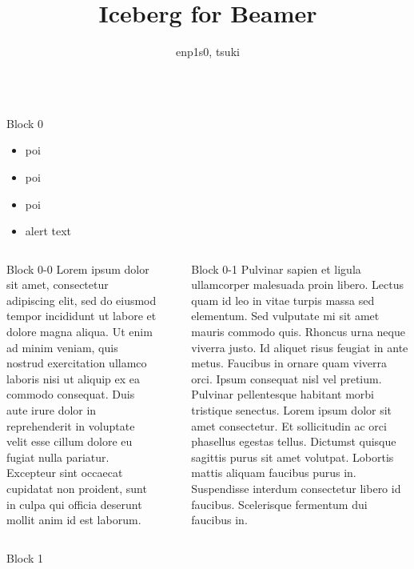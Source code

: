 \documentclass[final,dvipdfmx,t]{beamer}
\title[]{Iceberg for Beamer}
\author[]{enp1s0\inst{1}, tsuki\inst{2} }
\institute[shortinst]{\inst{1} School of Computing, TokyoTech
	\inst{2} Global Scientific Information and Computing Center, TokyoTech}
\begin{document}
\begin{frame}
	\begin{columns}
		\begin{column}{0.485\textwidth}
			\begin{block}{Block 0}
				\begin{itemize}
					\item poi
					\item poi
					\item poi
					\item \alert{alert text}
				\end{itemize}
			\end{block}
			\vspace{-1.1em}
			\begin{columns}
				\begin{column}{0.485\textwidth}
					\begin{block}{Block 0-0}
						Lorem ipsum dolor sit amet, consectetur adipiscing elit, sed do eiusmod tempor incididunt ut labore et dolore magna aliqua. Ut enim ad minim veniam, quis nostrud exercitation ullamco laboris nisi ut aliquip ex ea commodo consequat. Duis aute irure dolor in reprehenderit in voluptate velit esse cillum dolore eu fugiat nulla pariatur. Excepteur sint occaecat cupidatat non proident, sunt in culpa qui officia deserunt mollit anim id est laborum.
					\end{block}
				\end{column}
				\begin{column}{0.0001\textwidth}
				\end{column}
				\begin{column}{0.485\textwidth}
					\begin{block}{Block 0-1}
						Pulvinar sapien et ligula ullamcorper malesuada proin libero. Lectus quam id leo in vitae turpis massa sed elementum. Sed vulputate mi sit amet mauris commodo quis. Rhoncus urna neque viverra justo. Id aliquet risus feugiat in ante metus. Faucibus in ornare quam viverra orci. Ipsum consequat nisl vel pretium. Pulvinar pellentesque habitant morbi tristique senectus. Lorem ipsum dolor sit amet consectetur. Et sollicitudin ac orci phasellus egestas tellus. Dictumst quisque sagittis purus sit amet volutpat. Lobortis mattis aliquam faucibus purus in. Suspendisse interdum consectetur libero id faucibus. Scelerisque fermentum dui faucibus in.
					\end{block}
				\end{column}
			\end{columns}
			\begin{block}{Block 1}

\end{block}
\end{column}
\end{columns}
\end{frame}
\end{document}
